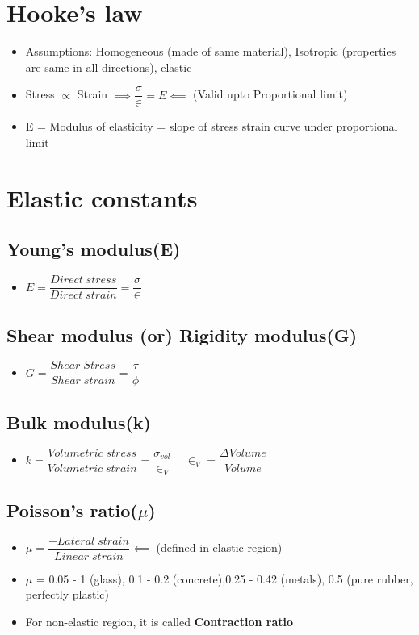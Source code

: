 \documentclass[8pt]{report}
\begin{document}
	\section{Hooke's law}
		\begin{itemize}
			\item Assumptions: Homogeneous (made of same material), Isotropic (properties are same in all directions), elastic
			\item Stress $\propto$ Strain $\implies \boxed{\dfrac{\sigma}{\in}=E} \impliedby$ (Valid upto Proportional limit)
			\item E = Modulus of elasticity = slope of stress strain curve under proportional limit 
		\end{itemize}\hrulefill
	\section{Elastic constants}
		\subsection{Young's modulus(E)}
			\begin{itemize}
				\item $\boxed{E = \dfrac{Direct\;stress}{Direct\;strain} = \dfrac{\sigma}{\in}}$
			\end{itemize}
		\subsection{Shear modulus (or) Rigidity modulus(G)}
			\begin{itemize}
				\item $\boxed{G = \dfrac{Shear\;Stress}{Shear\;strain} = \dfrac{\tau}{\phi}}$
			\end{itemize}
		\subsection{Bulk modulus(k)}
			\begin{itemize}
				\item $\boxed{k = \dfrac{Volumetric\;stress}{Volumetric\;strain} = \dfrac{\sigma_{vol}}{\in_V}}\;\;\;$ $\boxed{\in_V = \dfrac{\Delta Volume}{Volume}}$ 
			\end{itemize}\hrulefill
		\subsection{Poisson's ratio($\mu$)}
		\begin{itemize}
			\item $\boxed{\mu = \dfrac{-Lateral\;strain}{Linear\;strain}}\impliedby$ (defined in elastic region)
			\item $\mu$ = 0.05 - 1 (glass), 0.1 - 0.2 (concrete),0.25 - 0.42 (metals), 0.5 (pure rubber, perfectly plastic)
			\item For non-elastic region, it is called \textbf{Contraction ratio}
		\end{itemize}\hrulefill
\end{document}
